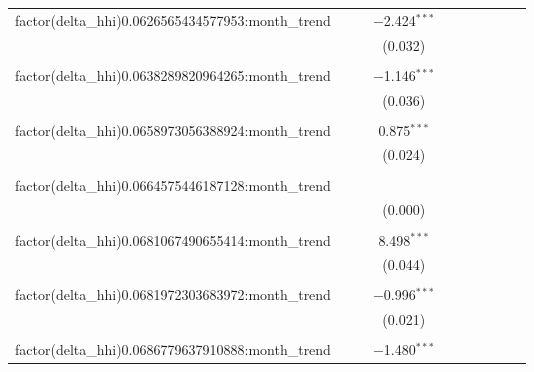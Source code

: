 \begin{table}[H]
{\begin{tabular}{@{\extracolsep{5pt}}lccccccccc}
  factor(delta\_hhi)0.0626565434577953:month\_trend &  &  & $-$2.424$^{***}$ &  &  &  &  &  &  \\  

   &  &  & (0.032) &  &  &  &  &  &  \\  

   & & & & & & & & & \\  

  factor(delta\_hhi)0.0638289820964265:month\_trend &  &  & $-$1.146$^{***}$ &  &  &  &  &  &  \\  

   &  &  & (0.036) &  &  &  &  &  &  \\  

   & & & & & & & & & \\  

  factor(delta\_hhi)0.0658973056388924:month\_trend &  &  & 0.875$^{***}$ &  &  &  &  &  &  \\  

   &  &  & (0.024) &  &  &  &  &  &  \\  

   & & & & & & & & & \\  

  factor(delta\_hhi)0.0664575446187128:month\_trend &  &  &  &  &  &  &  &  &  \\  

   &  &  & (0.000) &  &  &  &  &  &  \\  

   & & & & & & & & & \\  

  factor(delta\_hhi)0.0681067490655414:month\_trend &  &  & 8.498$^{***}$ &  &  &  &  &  &  \\  

   &  &  & (0.044) &  &  &  &  &  &  \\  

   & & & & & & & & & \\  

  factor(delta\_hhi)0.0681972303683972:month\_trend &  &  & $-$0.996$^{***}$ &  &  &  &  &  &  \\  

   &  &  & (0.021) &  &  &  &  &  &  \\  

   & & & & & & & & & \\  

  factor(delta\_hhi)0.0686779637910888:month\_trend &  &  & $-$1.480$^{***}$ &  &  &  &  &  &  \\  


\end{tabular}}
\end{table}

